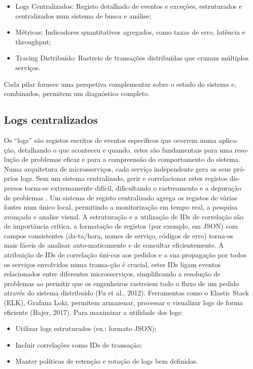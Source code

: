 \begin{itemize}
    \item Logs Centralizados: Registo detalhado de eventos e exceções, estruturados e centralizados num sistema de busca e análise;
    \item Métricas: Indicadores quantitativos agregados, como taxas de erro, latência e throughput;
    \item Tracing Distribuído: Rastreio de transações distribuídas que cruzam múltiplos serviços.
\end{itemize}

Cada pilar fornece uma perspetiva complementar sobre o estado do sistema e, combinados, permitem um diagnóstico completo.


\subsection{Logs centralizados}

Os “logs” são registos escritos de eventos específicos que ocorrem numa aplica-ção, detalhando o que aconteceu e quando, estes são fundamentais para uma reso-lução de problemas eficaz e para a compreensão do comportamento do sistema.
Numa arquitetura de microsserviços, cada serviço independente gera os seus pró-prios logs. Sem um sistema centralizado, gerir e correlacionar estes registos dis-persos torna-se extremamente difícil, dificultando o rastreamento e a depuração de problemas \cite{Soldani2022}. Um sistema de registo centralizado agrega os registos de várias fontes num único local, permitindo a monitorização em tempo real, a pesquisa avançada e analise visual.
A estruturação e a utilização de IDs de correlação são de importância crítica, a formatação de registos (por exemplo, em JSON) com campos consistentes (da-ta/hora, nomes de serviço, códigos de erro) torna-os mais fáceis de analisar auto-maticamente e de consultar eficientemente. A atribuição de IDs de correlação úni-cos aos pedidos e a sua propagação por todos os serviços envolvidos numa transa-ção é crucial, estes IDs ligam eventos relacionados entre diferentes microsserviços, simplificando a resolução de problemas ao permitir que os engenheiros rastreiem todo o fluxo de um pedido através do sistema distribuído (Fu et al., 2012).
Ferramentas como o Elastic Stack (ELK), Grafana Loki, permitem armazenar, processar e visualizar logs de forma eficiente (Bajer, 2017).
Para maximizar a utilidade dos logs:

\begin{itemize}
    \item Utilizar logs estruturados (ex.: formato JSON);
    \item Incluir correlações como IDs de transação;
    \item Manter políticas de retenção e rotação de logs bem definidas.
\end{itemize}

